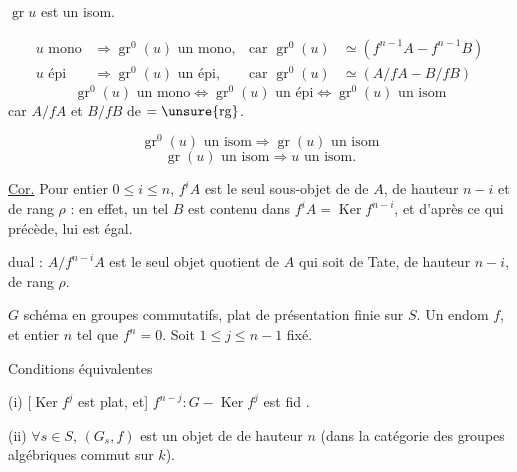  $\operatorname{gr}u$ est un isom.

\[
\begin{aligned}
u\text{ mono}&\Longrightarrow\operatorname{gr}^0(u)\text{ un mono},&\text{car }\operatorname{gr}^0(u)&\simeq(f^{n-1}A-f^{n-1}B)\\
u\text{ épi}&\Longrightarrow\operatorname{gr}^0(u)\text{ un épi},&\text{car }\operatorname{gr}^0(u)&\simeq(A/fA-B/fB)
\end{aligned}
\]
\[
\operatorname{gr}^0(u)\text{ un mono}\Longleftrightarrow\operatorname{gr}^0(u)\text{ un épi}\Longleftrightarrow\operatorname{gr}^0(u)\text{ un isom}
\]
car $A/fA$ et $B/fB$ de \uline{$=\unsure{\operatorname{rg}}$}.

\[
\operatorname{gr}^0(u)\text{ un isom}\Longrightarrow\operatorname{gr}(u)\text{ un isom}
\]
\[
\operatorname{gr}(u)\text{ un isom}\Longrightarrow u\text{ un isom}.
\]

\uline{Cor.}  Pour \unsure{$\forall$} entier $0\leq i\leq n$, $f^iA$ est le seul sous-objet de   de $A$, de hauteur $n-i$ et de rang $\rho$ : en effet, un tel $B$ est contenu dans $f^iA=\operatorname{Ker}f^{n-i}$, et d'après ce qui précède, lui est égal.

 dual : $A/f^{n-i}A$ est le seul objet quotient de $A$ qui soit de Tate, de hauteur $n-i$, de rang $\rho$.


$G$ schéma en groupes commutatifs, plat  de présentation finie sur $S$. Un endom $f$, et entier $n$ tel que $f^n=0$. Soit $1\leq j\leq n-1$ fixé.

Conditions équivalentes

(i) [$\operatorname{Ker}f^j$ est plat, et]  $f^{n-j}:G-\operatorname{Ker}f^j$ est fid .

(ii) $\forall s\in S$, $(G_s,f)$ est un objet de  de  hauteur $n$ (dans la catégorie des groupes algébriques commut sur $k$).
